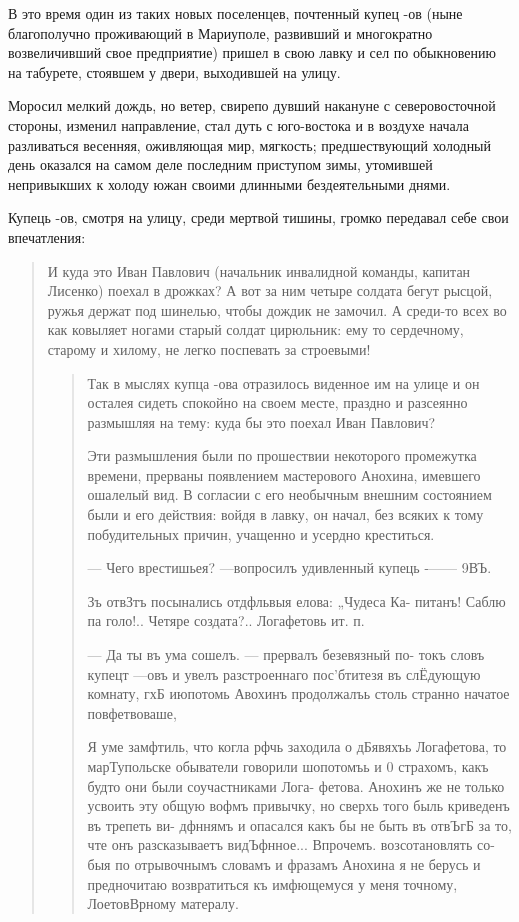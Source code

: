 В это время один из таких новых поселенцев,
почтенный купец -ов (ныне благополучно проживающий
в Мариуполе, развивший и многократно возвеличивший свое
предприятие) пришел в свою лавку и сел по обыкновению
на табурете, стоявшем у двери, выходившей на улицу. 

Моросил мелкий дождь, но ветер, свирепо дувший накануне с северовосточной
стороны, изменил направление, стал дуть с юго-востока и в воздухе начала
разливаться весенняя, оживляющая мир, мягкость; предшествующий холодный день
оказался на самом деле последним приступом зимы, утомившей непривыкших к холоду
южан своими длинными бездеятельными днями.

Купець -ов, смотря на улицу, среди мертвой тишины, 
громко передавал себе свои впечатления: 

\begin{quote}
\em\bfseries

И куда это
Иван Павлович (начальник инвалидной команды, капитан Лисенко) поехал в дрожках?
А вот за ним четыре солдата бегут рысцой, ружья держат под шинелью, чтобы дождик не замочил. А среди-то всех во как
ковыляет ногами старый солдат цирюльник: ему то сердечному, старому и хилому, не легко поспевать за строевыми!
\begin{quote}

Так в мыслях купца -ова отразилось виденное
им на улице и он осталея сидеть спокойно на своем
месте, праздно и разсеянно размышляя на тему: куда бы это
поехал Иван Павлович?

Эти размышления были по прошествии некоторого промежутка времени, прерваны появлением мастерового 
Анохина, имевшего ошалелый вид. В согласии с его необычным внешним состоянием были и его действия: войдя в лавку,
он начал, без всяких к тому побудительных причин, учащенно и усердно креститься.


— Чего врестишьея? —вопросилъ удивленный купець
-—— 9ВЪ.

Зъ отвЗтъ посынались отдфльвыя елова: „Чудеса Ка-
питанъ! Саблю па голо!.. Четяре создата?.. Логафетовь ит. п.

— Да ты въ ума сошелъ. — прервалъ безевязный по-
токъ словъ купецт —овъ и увелъ разстроеннаго пос’бтитезя
въ слЁдующую комнату, гхБ июпотомь Авохинъ продолжалъь
столь странно начатое повфетвоваше,

Я уме замфтиль, что когла рфчь заходила о дБявяхъь
Логафетова, то марТупольске обыватели говорили шопотомъь
и 0 страхомъ, какъ будто они были соучастниками Лога-
фетова. Анохинъ же не только усвоить эту общую вофмъ
привычку, но сверхь того быль криведенъ въ трепеть ви-
дфннямъ и опасался какъ бы не быть въ отвЪгБ за то, чте
онъ разсказываетъ видЪфнное... Впрочемъ. возсотановлять со-
быя по отрывочнымъ словамъ и фразамъ Анохина я не
берусь и предночитаю возвратиться къ имфющемуся у меня
точному, ЛоетовВрному матералу.


\end{quote}
\end{quote}
